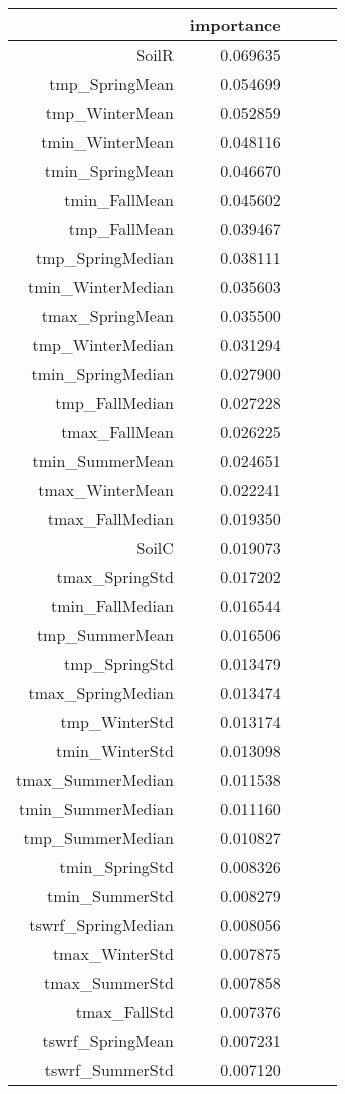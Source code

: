 \begin{tabular}{rrrrr}
\toprule
 & importance \\
\midrule
SoilR & 0.069635 \\
tmp_SpringMean & 0.054699 \\
tmp_WinterMean & 0.052859 \\
tmin_WinterMean & 0.048116 \\
tmin_SpringMean & 0.046670 \\
tmin_FallMean & 0.045602 \\
tmp_FallMean & 0.039467 \\
tmp_SpringMedian & 0.038111 \\
tmin_WinterMedian & 0.035603 \\
tmax_SpringMean & 0.035500 \\
tmp_WinterMedian & 0.031294 \\
tmin_SpringMedian & 0.027900 \\
tmp_FallMedian & 0.027228 \\
tmax_FallMean & 0.026225 \\
tmin_SummerMean & 0.024651 \\
tmax_WinterMean & 0.022241 \\
tmax_FallMedian & 0.019350 \\
SoilC & 0.019073 \\
tmax_SpringStd & 0.017202 \\
tmin_FallMedian & 0.016544 \\
tmp_SummerMean & 0.016506 \\
tmp_SpringStd & 0.013479 \\
tmax_SpringMedian & 0.013474 \\
tmp_WinterStd & 0.013174 \\
tmin_WinterStd & 0.013098 \\
tmax_SummerMedian & 0.011538 \\
tmin_SummerMedian & 0.011160 \\
tmp_SummerMedian & 0.010827 \\
tmin_SpringStd & 0.008326 \\
tmin_SummerStd & 0.008279 \\
tswrf_SpringMedian & 0.008056 \\
tmax_WinterStd & 0.007875 \\
tmax_SummerStd & 0.007858 \\
tmax_FallStd & 0.007376 \\
tswrf_SpringMean & 0.007231 \\
tswrf_SummerStd & 0.007120 \\

\end{tabular}
